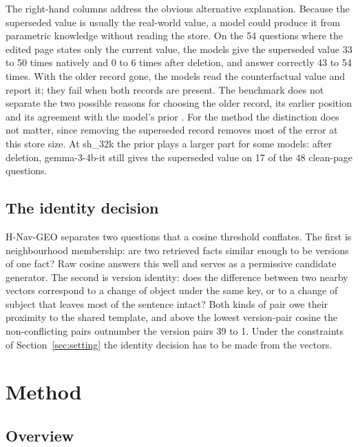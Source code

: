 \documentclass{CUP-JNL-NLP}
\newcommand{\sub}[1]{\textsf{sh\_#1}}                    %
\newcommand{\geo}{H-Nav-GEO}
\begin{document}
The right-hand columns address the obvious alternative explanation. Because the superseded value is usually the real-world value, a model could produce it from parametric knowledge without reading the store. On the 54 questions where the edited page states only the current value, the models give the superseded value 33 to 50 times natively and 0 to 6 times after deletion, and answer correctly 43 to 54 times. With the older record gone, the models read the counterfactual value and report it; they fail when both records are present. The benchmark does not separate the two possible reasons for choosing the older record, its earlier position \citep{liu2024lost,guo2025serial} and its agreement with the model's prior \citep{yu2023characterizing,xie2024adaptive,wu2024clasheval}.
For the method the distinction does not matter, since removing the superseded record removes most of the error at this store size. At \sub{32k} the prior plays a larger part for some models: after deletion, gemma-3-4b-it still gives the superseded value on 17 of the 48 clean-page questions.

\subsection{The identity decision}
\label{sec:identity}

\geo{} separates two questions that a cosine threshold conflates. The first is neighbourhood membership: are two retrieved facts similar enough to be versions of one fact? Raw cosine answers this well and serves as a permissive candidate generator. The second is version identity: does the difference between two nearby vectors correspond to a change of object under the same key, or to a change of subject that leaves most of the sentence intact? Both kinds of pair owe their proximity to the shared template, and above the lowest version-pair cosine the non-conflicting pairs outnumber the version pairs 39 to 1. Under the constraints of Section~\ref{sec:setting} the identity decision has to be made from the vectors.

\section{Method}
\label{sec:method}

\subsection{Overview}
\label{sec:overview}
\end{document}
